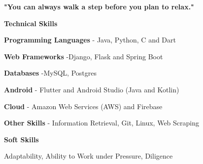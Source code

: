 
\textbf{"You can always walk a step before you plan to relax."}
\medskip



\textbf{\large Technical Skills}
\par
\medskip
\textbf{Programming Languages} -
Java, Python, C and Dart
\medskip

\textbf{Web Frameworks} -Django, Flask and Spring Boot
\medskip

\textbf{Databases} -MySQL, Postgres
\medskip

\textbf{Android} - Flutter and Android Studio (Java and Kotlin)
\medskip

\textbf{Cloud} - Amazon Web Services (AWS) and Firebase
\medskip

\textbf{Other Skills} - Information Retrieval, Git, Linux, Web Scraping
\divider

\textbf{\large Soft Skills}
\par
\medskip
Adaptability, Ability to Work under Pressure, Diligence
\divider



